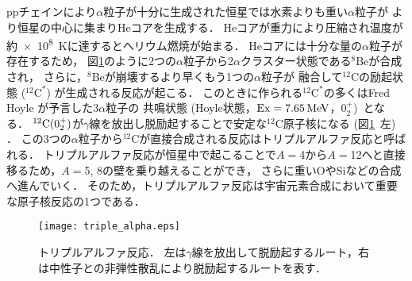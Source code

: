 \documentclass[../master]{subfiles}
\begin{document}
ppチェインにより$\alpha$粒子が十分に生成された恒星では水素よりも重い$\alpha$粒子が
より恒星の中心に集まり$\mathrm{He}$コアを生成する．
$\mathrm{He}$コアが重力により圧縮され温度が約\SI{e8}{\kelvin}に達するとヘリウム燃焼が始まる．
$\mathrm{He}$コアには十分な量の$\alpha$粒子が存在するため，
図\ref{fig::triple_alpha}のように2つの$\alpha$粒子から2$\alpha$クラスター状態である${}^{8}\mathrm{Be}$が合成され，
さらに，${}^{8}\mathrm{Be}$が崩壊するより早くもう1つの$\alpha$粒子が
融合して${}^{12}\mathrm{C}$の励起状態 (${}^{12}\mathrm{C}^{*}$) が生成される反応が起こる．
このときに作られる${}^{12}\mathrm{C}^{*}$の多くはFred Hoyle が予言した$3\alpha$粒子の
共鳴状態 (Hoyle状態，${\rm Ex} = \SI{7.65}{\mega\electronvolt}$，$0_{2}^{+}$)~\cite{hoyle_state}となる．
${}^{12}{\rm C} (0_2^+)$が$\gamma$線を放出し脱励起することで安定な${}^{12}\mathrm{C}$原子核になる
 (図\ref{fig::triple_alpha}~左) ．
この3つの$\alpha$粒子から${}^{12}\mathrm{C}$が直接合成される反応はトリプルアルファ反応と呼ばれる．
トリプルアルファ反応が恒星中で起こることで$A = $4から$A = $12へと直接移るため，$A = $5, 8の壁を乗り越えることができ，
さらに重い$\mathrm{O}$や$\mathrm{Si}$などの合成へ進んでいく．
そのため，トリプルアルファ反応は宇宙元素合成において重要な原子核反応の1つである．
\begin{figure}
  \centering
  \texttt{[image: triple\_alpha.eps]}
  \caption[トリプルアルファ反応．]{トリプルアルファ反応．
    左は$\gamma$線を放出して脱励起するルート，右は中性子との非弾性散乱により脱励起するルートを表す．}
  \label{fig::triple_alpha}
\end{figure}
\end{document}
